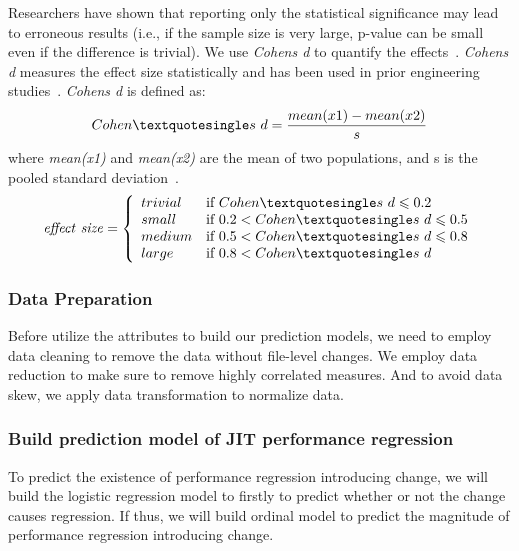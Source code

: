 \begin{enumerate}[(i)]
Researchers have shown that reporting only the statistical significance may lead to erroneous results (i.e., if the sample size is very large, p-value can be small even if the difference is trivial). We use \emph{Cohen\textquotesingle s d} to quantify the effects~\cite{ES2006:Becker}. \emph{Cohen\textquotesingle s d} measures the effect size statistically and has been used in prior engineering studies~\cite{IST2007:Kampenes, ICSE2002:Kitchenham}. \emph{Cohen\textquotesingle s d} is defined as:
$$
Cohen\textquotesingle s \ d=\frac{mean(x1)-mean(x2)}{s}
$$
where \emph{mean(x1)} and \emph{mean(x2)} are the mean of two populations, and s is the pooled standard deviation~\cite{JohnWiley:2011}.
$$
\mathit{effect \ size} = \left\{ \begin{array}{ll}
trivial & \textrm{if $Cohen\textquotesingle s \ d  \leqslant 0.2$}\\
small & \textrm{if $0.2 < Cohen\textquotesingle s \ d \leqslant 0.5$}\\
medium& \textrm{if $0.5 < Cohen\textquotesingle s \ d \leqslant 0.8$}\\
large& \textrm{if $0.8 < Cohen\textquotesingle s \ d$}
\end{array} \right.
$$

\end{enumerate}
\subsubsection{Data Preparation}
Before utilize the attributes to build our prediction models, we need to employ data cleaning to remove the data without file-level changes. We employ data reduction to make sure to remove highly correlated measures. And to avoid data skew, we apply data transformation to normalize data.
\subsubsection{Build prediction model of JIT performance regression}
To predict the existence of performance regression introducing change, we will build the logistic regression model to firstly to predict whether or not the change causes regression. If thus, we will build ordinal model to predict the magnitude of performance regression introducing change.

